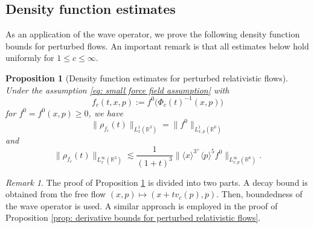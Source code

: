 \documentclass[reqno, 11pt, letterpaper]{amsart}
\newtheorem{proposition}[theorem]{Proposition}
\theoremstyle{remark}
\newtheorem{remark}[theorem]{Remark}
\numberwithin{equation}{section}
\numberwithin{theorem}{section}
\numberwithin{table}{section}
\numberwithin{figure}{section}
\begin{document}
\subsection{Density function estimates}

As an application of the wave operator, we prove the following density function bounds for perturbed flows. An important remark is that all estimates below hold uniformly for $1 \leq c \leq \infty$.


\begin{proposition}[Density function estimates for perturbed relativistic flows]\label{prop: density function estimates for perturbed relativistic flows}
Under the assumption \eqref{eq: small force field assumption}  with
$$f_c(t,x,p):=f^0\Big(\Phi_c(t)^{-1}(x,p)\Big)$$
for $f^0=f^0(x,p)\geq 0$, we have 
\begin{equation}\label{eq: L 1 density function estimate}
\|\rho_{f_c}(t)\|_{L_x^1(\mathbb{R}^3)}=\|f^0\|_{L_{x,p}^1(\mathbb{R}^6)}
\end{equation}
and
\begin{equation}\label{eq: L infinity density function estimate}
\|\rho_{f_c}(t)\|_{L_x^\infty(\mathbb{R}^3)}\lesssim\frac{1}{(1+t)^3}\Big\|\langle x\rangle^{3^+}\langle p\rangle^5 f^0\Big\|_{L_{x,p}^\infty(\mathbb{R}^6)}.
\end{equation}
\end{proposition}

\begin{remark}
The proof of Proposition \ref{prop: density function estimates for perturbed relativistic flows} is divided into two parts. A decay bound is obtained from the free flow $(x,p)\mapsto (x+tv_c(p),p)$. Then, boundedness of the wave operator is used. A similar approach is employed in the proof of Proposition \ref{prop: derivative bounds for perturbed relativistic flows}.
\end{remark}
\end{document}
